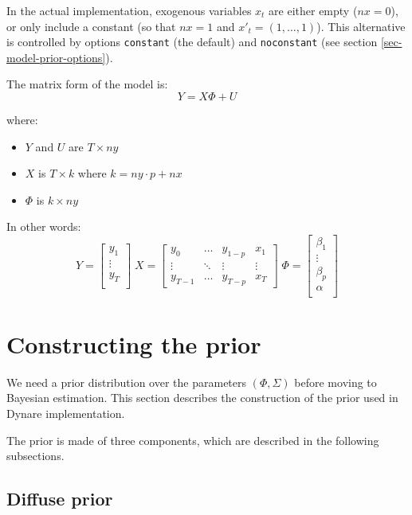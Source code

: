 \documentclass[11pt,a4paper]{article}
\begin{document}
In the actual implementation, exogenous variables $x_t$ are either empty ($nx = 0$), or only include a constant (so that $nx = 1$ and $x'_t = (1, \ldots, 1)$). This alternative is controlled by options \texttt{constant} (the default) and \texttt{noconstant} (see section \ref{sec-model-prior-options}).

The matrix form of the model is:
$$Y = X\Phi + U$$

where:
\begin{itemize}
\item $Y$ and $U$ are $T\times ny$
\item $X$ is $T\times k$ where $k = ny\cdot p + nx$
\item $\Phi$ is $k \times ny$
\end{itemize}

In other words:
$$Y = \left[
\begin{array}{c}
y_1 \\
\vdots \\
y_T \\
\end{array}
\right]
\; X = \left[
\begin{array}{cccc}
y_0 & \ldots & y_{1-p} & x_1 \\
\vdots & \ddots & \vdots & \vdots \\
y_{T-1} & \ldots & y_{T-p} & x_T
\end{array}
\right]
\; \Phi = \left[
\begin{array}{c}
\beta_1 \\
\vdots \\
\beta_p \\
\alpha \\
\end{array}
\right]$$


\section{Constructing the prior}
\label{sec-prior}

We need a prior distribution over the parameters $(\Phi, \Sigma)$ before moving to Bayesian estimation. This section describes the construction of the prior used in Dynare implementation.

The prior is made of three components, which are described in the following subsections.

\subsection{Diffuse prior}
\end{document}
